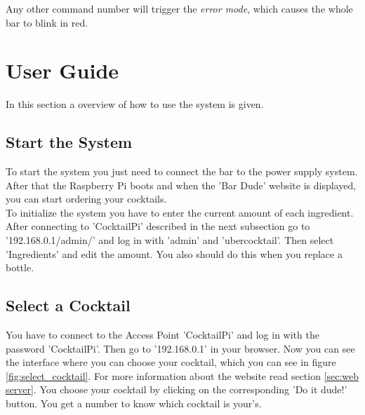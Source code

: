 \documentclass{acm_proc_article-sp}
\begin{document}
Any other command number will trigger the \textit{error mode}, which causes the whole bar to blink in red.

\section{User Guide}
In this section a overview of how to use the system is given.
\subsection{Start the System}
To start the system you just need to connect the bar to the power supply system. After that the Raspberry Pi boots and when the 'Bar Dude' website is displayed, you can start ordering your cocktails. \\
To initialize the system you have to enter the current amount of each ingredient. After connecting to 'CocktailPi' described in the next subsection go to '192.168.0.1/admin/' and log in with 'admin' and 'ubercocktail'. Then select 'Ingredients' and edit the amount. You also should do this when you replace a bottle.
 \subsection{Select a Cocktail}
You have to connect to the Access Point 'CocktailPi' and log in with the password 'CocktailPi'. Then go to '192.168.0.1' in your browser. Now you can see the interface where you can choose your cocktail, which you can see in figure \ref{fig:select_cocktail}. For more information about the website read section \ref{sec:web server}. You choose your cocktail by clicking on the corresponding 'Do it dude!' button. You get a number to know which cocktail is your's.

\begin{minipage}{\linewidth}%
\label{fig:select_cocktail}%
\end{minipage}
\end{document}
